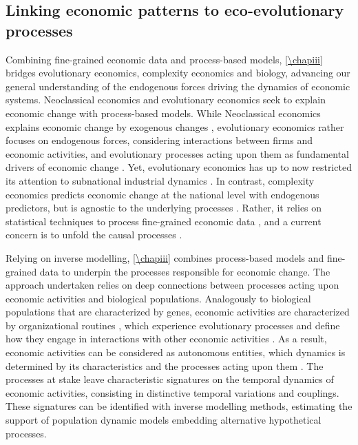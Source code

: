 \subsection{Linking economic patterns to eco-evolutionary processes}

Combining fine-grained economic data and process-based models, \cref{\chapiii} bridges evolutionary economics, complexity economics and biology, advancing our general understanding of the endogenous forces driving the dynamics of economic systems.
% 
Neoclassical economics and evolutionary economics seek to explain economic change with process-based models.
% 
While Neoclassical economics explains economic change by exogenous changes \citep{Boschma2005a}, evolutionary economics rather focuses on endogenous forces, considering interactions between firms and economic activities, and evolutionary processes acting upon them as fundamental drivers of economic change \citep{Metcalfe2006}. Yet, evolutionary economics has up to now restricted its attention to subnational industrial dynamics \citep{Hodgson2019}.
% 
In contrast, complexity economics \citep{Hidalgo2021} predicts economic change at the national level with endogenous predictors, but is agnostic to the underlying processes \citep{Hidalgo2021}. Rather, it relies on statistical techniques to process fine-grained economic data \citep{Mealy2019}, and a current concern is to unfold the causal processes \citep{Hidalgo2021}.


Relying on inverse modelling, \cref{\chapiii} combines process-based models and fine-grained data to underpin the processes responsible for economic change.
% 
The approach undertaken relies on deep connections between processes acting upon economic activities and biological populations.
% 
Analogously to biological populations that are characterized by genes, economic activities are characterized by organizational routines \citep{nelson1985evolutionary}, which experience evolutionary processes and define how they engage in interactions with other economic activities \citep{nelson1985evolutionary}.
% 
As a result, economic activities can be considered as autonomous entities, which dynamics is determined by its characteristics and the processes acting upon them \citep{Boschma2005a}.
% 
The processes at stake leave characteristic signatures on the temporal dynamics of economic activities, consisting in distinctive temporal variations and couplings.
% 
These signatures can be identified with inverse modelling methods, estimating the support of population dynamic models embedding alternative hypothetical processes.

